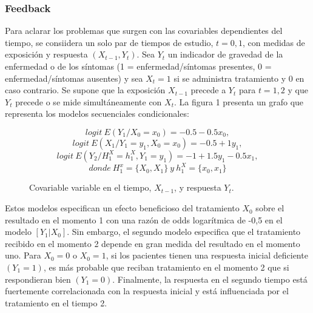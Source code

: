 \documentclass[spanish]{article}
\numberwithin{figure}{subsection}
\numberwithin{equation}{subsection}
\numberwithin{table}{subsection}
\begin{document}
\subsubsection{Feedback}

Para aclarar los problemas que surgen con las covariables dependientes del
tiempo, se consiidera un solo par de tiempos de estudio, $t = 0, 1$, con
medidas de exposición y respuesta $(X_{t-1}, Y_t)$. Sea $Y_t$ un indicador de
gravedad de la enfermedad o de los síntomas (1 = enfermedad/síntomas presentes,
0 = enfermedad/síntomas ausentes) y sea $X_t = 1$ si se administra tratamiento
y $0$ en caso contrario. Se supone que la exposición $X_{t-1}$ precede a $Y_t$
para $t = 1, 2$ y que $Y_t$ precede o se mide simultáneamente con $X_t$. La
figura 1 presenta un grafo que representa los modelos secuenciales
condicionales:

\begin{equation}
	\label{feedback_1}
	logit \ E(Y_1 / X_0 = x_0) = -0.5 - 0.5x_0,
\end{equation}
\begin{equation}
	\label{feedback_2}
	logit \ E(X_1 / Y_1 = y_1, X_0 = x_0) = -0.5 + 1y_1,
\end{equation}
\begin{equation}
	\label{feedback_3}
	logit \ E(Y_2 / H_1^X = h_1^X, Y_1 = y_1) = -1 + 1.5y_1 - 0.5x_1,
\end{equation}
\[ donde \ H_1^x = \{ X_0, X_1 \} \ y \ h_1^X = \{ x_0, x_1 \} \]

\begin{figure}[h]
\centering
{}
\caption{Covariable variable en el tiempo, $X_{t-1}$, y respuesta $Y_t$.}
\end{figure}

Estos modelos especifican un efecto beneficioso del tratamiento $X_0$ sobre el
resultado en el momento 1 con una razón de odds logarítmica de -0,5 en el
modelo $[Y_1|X_0]$. Sin embargo, el segundo modelo especifica que el
tratamiento recibido en el momento 2 depende en gran medida del resultado en el
momento uno. Para $X_0 = 0$ o $X_0 = 1$, si los pacientes tienen una respuesta
inicial deficiente $(Y_1 = 1)$, es más probable que reciban tratamiento en el
momento 2 que si respondieran bien $(Y_1 = 0)$. Finalmente, la respuesta en el
segundo tiempo está fuertemente correlacionada con la respuesta inicial y está
influenciada por el tratamiento en el tiempo 2.
\end{document}

